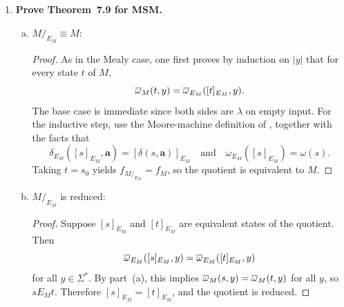 \begin{enumerate}[{7.}1.]
Fix any $n\ge 1$.  Consider the following two length-$(n+1)$ input strings of
column pairs:
\[
  x=\langle 0,0\rangle\langle 0,1\rangle^{n-1}\langle 1,1\rangle
  \qquad\text{and}\qquad
  y=\langle 0,0\rangle\langle 0,1\rangle^{n-1}\langle 0,1\rangle.
\]
These two inputs agree on their first $n$ symbols.  However, their first output
symbols are different when the addition is carried out correctly from right to
left:
\begin{itemize}
  \item For $x$, the last column $\langle 1,1\rangle$ generates a carry.  Each
  middle column $\langle 0,1\rangle$ propagates that carry, so a carry reaches
  the first column $\langle 0,0\rangle$.  Hence the first output bit is
  $\pmb{1}$.
  \item For $y$, the last column $\langle 0,1\rangle$ generates no carry, so no
  carry reaches the first column.  Hence the first output bit is $\pmb{0}$.
\end{itemize}
Thus the first output symbols of $f_4(x)$ and $f_4(y)$ differ, even though the
first $n$ input symbols of $x$ and $y$ are identical.  This contradicts
Exercise~7.36.  Therefore $f_4$ is not FTD.

\item \textbf{Prove Theorem~7.9 for MSM.}

\begin{enumerate}[(a)]
  \item $M/_{E_M}\equiv M$:

  \begin{proof}
  As in the Mealy case, one first proves by induction on $|y|$ that for every
  state $t$ of $M$,
  \[
    \overline{\omega}_M(t,y)=\overline{\omega}_{E_M}([t]_{E_M},y).
  \]
  The base case is immediate since both sides are $\lambda$ on empty input.  For
  the inductive step, use the Moore-machine definition of \OBAR, together with
  the facts that
  \[
    \delta_{E_M}([s]_{E_M},\pmb{a})=[\delta(s,\pmb{a})]_{E_M}
    \quad\text{and}\quad
    \omega_{E_M}([s]_{E_M})=\omega(s).
  \]
  Taking $t=s_0$ yields
  $f_{M/_{E_M}}=f_M$, so the quotient is equivalent to $M$.
  \end{proof}

  \item $M/_{E_M}$ is reduced:

  \begin{proof}
  Suppose $[s]_{E_M}$ and $[t]_{E_M}$ are equivalent states of the quotient.
  Then
  \[
    \overline{\omega}_{E_M}([s]_{E_M},y)=\overline{\omega}_{E_M}([t]_{E_M},y)
  \]
  for all $y\in\Sigma^*$.  By part~(a), this implies
  $\overline{\omega}_M(s,y)=\overline{\omega}_M(t,y)$ for all $y$, so $s E_M t$.  Therefore
  $[s]_{E_M}=[t]_{E_M}$, and the quotient is reduced.
  \end{proof}


\end{enumerate}
\end{enumerate}
